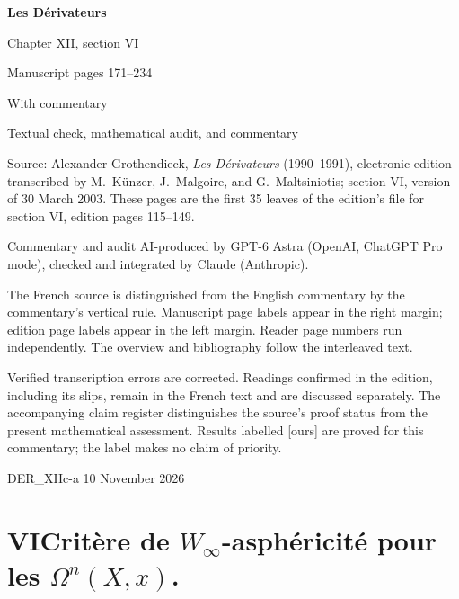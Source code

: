 \documentclass[11pt]{article}
\newcommand{\printedpage}[1]{{\reversemarginpar\marginnote{\raggedleft\scriptsize ed.~#1}}}
\newcommand{\msp}[1]{\marginpar{\raggedright\scriptsize ms.~#1}}
\begin{document}
\begin{titlepage}
\vspace*{18mm}
{\huge\bfseries Les Dérivateurs\par}
\vspace{7mm}
{\Large Chapter XII, section VI\par}
\vspace{3mm}
{\large Manuscript pages 171--234\par}
\vspace{12mm}
{\LARGE With commentary\par}
\vspace{5mm}
{\large Textual check, mathematical audit, and commentary\par}
\vspace{15mm}
\noindent Source: Alexander Grothendieck, \emph{Les Dérivateurs}
(1990--1991), electronic edition transcribed by M.~Künzer,
J.~Malgoire, and G.~Maltsiniotis; section VI, version of 30 March 2003.
These pages are the first 35 leaves of the edition's file for section VI,
edition pages 115--149.

\medskip
\noindent Commentary and audit AI-produced by GPT-6 Astra
(OpenAI, ChatGPT Pro mode), checked and integrated by Claude (Anthropic).

\medskip
\noindent The French source is distinguished from the English commentary
by the commentary's vertical rule. Manuscript page labels appear in
the right margin; edition page labels appear in the left margin.
Reader page numbers run independently. The overview and bibliography
follow the interleaved text.

\medskip
\noindent Verified transcription errors are corrected. Readings confirmed
in the edition, including its slips, remain in the French text and are
discussed separately. The accompanying claim register distinguishes
the source's proof status from the present mathematical assessment.
Results labelled [ours] are proved for this commentary; the label
makes no claim of priority.

\vfill
\noindent\small DER\_XIIc-a \hfill 10 November 2026
\end{titlepage}

\printedpage{115}

\msp{page 171}

\section*{VI\quad Critère de $W_\infty$-asphéricité pour les $\Omega^n(X,x)$.}
\end{document}
